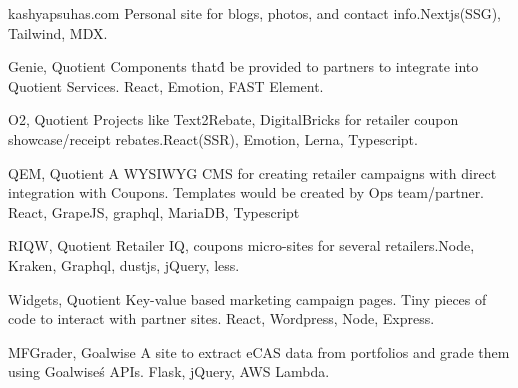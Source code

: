 \begin{cvskills}
	\cvskill
	{kashyapsuhas.com}
	{Personal site for blogs, photos, and contact info.\newline Nextjs(SSG), Tailwind, MDX.}
	
	\cvskill
	{Genie, Quotient}
	{Components that\'d be provided to partners to integrate into Quotient Services. \newline React, Emotion, FAST Element.}
	
	\cvskill
	{O2, Quotient}
	{Projects like Text2Rebate, DigitalBricks for retailer coupon showcase/receipt rebates.\newline React(SSR), Emotion, Lerna, Typescript.}
	
	\cvskill
	{QEM, Quotient}
	{A WYSIWYG CMS for creating retailer campaigns with direct integration with Coupons. Templates would be created by Ops team/partner. \newline React, GrapeJS, graphql, MariaDB, Typescript}
	
	\cvskill
	{RIQW, Quotient}
	{Retailer IQ, coupons micro-sites for several retailers.\newline Node, Kraken, Graphql, dustjs, jQuery, less.}
	
	\cvskill
	{Widgets, Quotient}
	{Key-value based marketing campaign pages. Tiny pieces of code to interact with partner sites. \newline React, Wordpress, Node, Express.}
	
	\cvskill
	{MFGrader, Goalwise}
	{A site to extract eCAS data from portfolios and grade them using Goalwise\'s APIs. \newline Flask, jQuery, AWS Lambda.}
\end{cvskills}